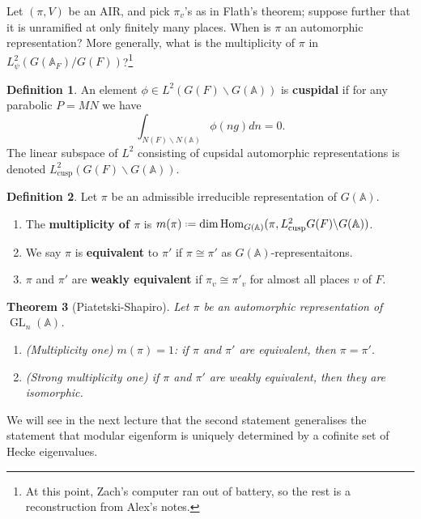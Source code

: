 \documentclass[11pt]{report}
\let\mbb\mathbb
\newcommand{\1}{\mathbbm 1}
\newcommand{\A}{\mbb A}
\newcommand{\bs}{\backslash}
\newcommand*{\defeq}{\mathrel{\vcenter{\baselineskip0.5ex \lineskiplimit0pt
      \hbox{\scriptsize.}\hbox{\scriptsize.}}}%
  =}
\DeclareMathOperator{\cusp}{cusp}
\DeclareMathOperator{\GL}{GL}
\DeclareMathOperator{\Hom}{Hom}
\theoremstyle{plain}
\newtheorem{thm}{Theorem}[section]
\newcounter{ex}
\theoremstyle{definition}
\newtheorem{mydef}[thm]{Definition}
\theoremstyle{remark}
\numberwithin{equation}{section}
\begin{document}
Let $(\pi,V)$ be an AIR, and pick $\pi_{v}$'s as in Flath's theorem;
suppose further that it is unramified at only finitely many
places. When is $\pi$ an automorphic representation? More generally,
what is the multiplicity of $\pi$ in
$L^{2}_{\psi}(G(\A_{F})/G(F))$?\footnote{At this point, Zach's computer
  ran out of battery, so the rest is a reconstruction from Alex's
  notes.}

\begin{mydef}
  An element $\phi \in L^{2}(G(F)\backslash G(\A))$ is \textbf{cuspidal} if for any parabolic
  $P = MN$ we have
  \begin{equation}
    \label{eq:31}
\int_{N(F)\bs N(\A)}\phi(ng) dn = 0.
  \end{equation}
  The linear subspace of $L^{2}$ consisting of cupsidal automorphic
  representations is denoted $L^{2}_{\cusp}(G(F)\bs G(\A))$.
\end{mydef}

\begin{mydef}
  Let $\pi$ be an admissible irreducible representation of $G(\A)$.
  \begin{enumerate}
  \item The \textbf{multiplicity of $\pi$} is $m(\pi) \defeq \dim
    \Hom_{G(\A)}(\pi,L^{2}_{\cusp}G(F)\bs G(\A))$.
  \item We say $\pi$ is \textbf{equivalent} to $\pi'$ if
    $\pi \cong \pi'$ as $G(\A)$-representaitons.
\item $\pi$ and $\pi'$ are \textbf{weakly equivalent} if $\pi_{v} \cong \pi'_{v}$
  for almost all places $v$ of $F$.
  \end{enumerate}
\end{mydef}

\begin{thm}[Piatetski-Shapiro]
  Let $\pi$ be an automorphic representation of $\GL_{n}(\A)$.
  \begin{enumerate}
  \item (Multiplicity one) $m(\pi) =1$: if $\pi$ and $\pi'$ are equivalent,
    then $\pi = \pi'$.
  \item (Strong multiplicity one) if $\pi$ and $\pi'$ are weakly
    equivalent, then they are isomorphic.
  \end{enumerate}
\end{thm}

We will see in the next lecture that the second statement generalises
the statement that modular eigenform is uniquely determined by
a cofinite set of Hecke eigenvalues.
\end{document}
